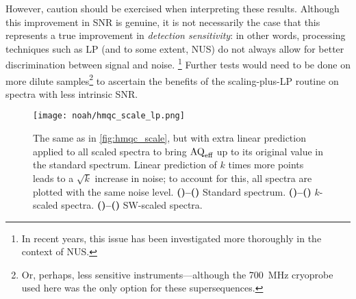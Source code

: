However, caution should be exercised when interpreting these results.
Although this improvement in SNR is genuine, it is not necessarily the case that this represents a true improvement in \textit{detection sensitivity}: in other words, processing techniques such as LP (and to some extent, NUS) do not always allow for better discrimination between signal and noise.\autocite{Donoho1990PNASUSA,Stern2002JACS}%
\footnote{In recent years, this issue has been investigated more thoroughly in the context of NUS.\autocite{Palmer2015JPCB}}
Further tests would need to be done on more dilute samples\footnote{Or, perhaps, less sensitive instruments---although the \qty{700}{\MHz} cryoprobe used here was the only option for these supersequences.} to ascertain the benefits of the scaling-plus-LP routine on spectra with less intrinsic SNR.

\begin{figure}[!htbp]
    \centering
    \texttt{[image: noah/hmqc\_scale\_lp.png]}%
    {\label{fig:hmqc_scale_lp_std2}}%
    {\label{fig:hmqc_scale_lp_std1}}%
    {\label{fig:hmqc_scale_lp_k22}}%
    {\label{fig:hmqc_scale_lp_k21}}%
    {\label{fig:hmqc_scale_lp_k42}}%
    {\label{fig:hmqc_scale_lp_k41}}%
    {\label{fig:hmqc_scale_lp_k82}}%
    {\label{fig:hmqc_scale_lp_k81}}%
    {\label{fig:hmqc_scale_lp_sw22}}%
    {\label{fig:hmqc_scale_lp_sw21}}%
    {\label{fig:hmqc_scale_lp_sw42}}%
    {\label{fig:hmqc_scale_lp_sw41}}%
    {\label{fig:hmqc_scale_lp_sw82}}%
    {\label{fig:hmqc_scale_lp_sw81}}%
    \caption[Effects of $k$- and SW-scaling on NOAH HMQC spectrum with extra linear prediction]{
        The same as in \cref{fig:hmqc_scale}, but with extra linear prediction applied to all scaled spectra to bring $\text{AQ}_\text{eff}$ up to its original value in the standard spectrum.
        Linear prediction of $k$ times more points leads to a $\sqrt{k}$ increase in noise; to account for this, all spectra are plotted with the same noise level.
        \textbf{()--()} Standard spectrum.
        \textbf{()--()} $k$-scaled spectra.
        \textbf{()--()} SW-scaled spectra.
    }
    \label{fig:hmqc_scale_lp}
\end{figure}
